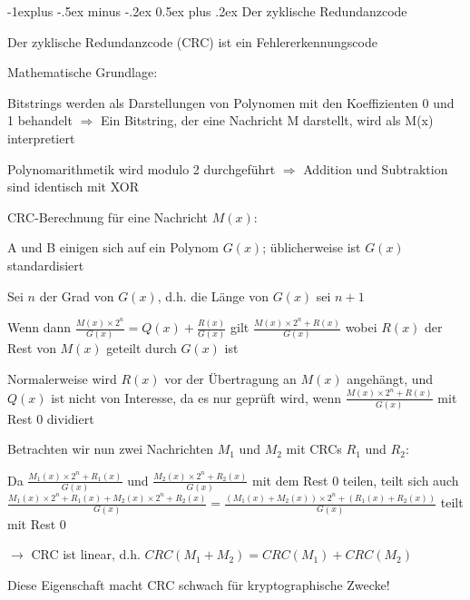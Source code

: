 \documentclass[a4paper]{article}
\makeatletter
\renewcommand{\subsection}{\@startsection{subsection}{2}{0mm}%
 {-1explus -.5ex minus -.2ex}%
 {0.5ex plus .2ex}%
 {\normalfont\normalsize\bfseries}}
\makeatother
\begin{document}
\begin{multicols}{3}
      \subsection{Der zyklische Redundanzcode}
      \begin{itemize*}
            \item Der zyklische Redundanzcode (CRC) ist ein Fehlererkennungscode
            \item Mathematische Grundlage:
            \begin{itemize*}
                  \item Bitstrings werden als Darstellungen von Polynomen mit den Koeffizienten 0 und 1 behandelt $\Rightarrow$ Ein Bitstring, der eine Nachricht M darstellt, wird als M(x) interpretiert
                  \item Polynomarithmetik wird modulo 2 durchgeführt $\Rightarrow$ Addition und Subtraktion sind identisch mit XOR
            \end{itemize*}
            \item CRC-Berechnung für eine Nachricht $M(x)$:
            \begin{itemize*}
                  \item A und B einigen sich auf ein Polynom $G(x)$; üblicherweise ist $G(x)$ standardisiert
                  \item Sei $n$ der Grad von $G(x)$, d.h. die Länge von $G(x)$ sei $n+1$
                  \item Wenn dann $\frac{M(x)\times 2^n}{G(x)}=Q(x)+\frac{R(x)}{G(x)}$ gilt $\frac{M(x)\times 2^n +R(x)}{G(x)}$ wobei $R(x)$ der Rest von $M(x)$ geteilt durch $G(x)$ ist
                  \item Normalerweise wird $R(x)$ vor der Übertragung an $M(x)$ angehängt, und $Q(x)$ ist nicht von Interesse, da es nur geprüft wird, wenn $\frac{M(x)\times 2^n+R(x)}{G(x)}$ mit Rest $0$ dividiert
            \end{itemize*}
            \item Betrachten wir nun zwei Nachrichten $M_1$ und $M_2$ mit CRCs $R_1$ und $R_2$:
            \begin{itemize*}
                  \item Da $\frac{M_1(x)\times 2^n+R_1(x)}{G(x)}$ und $\frac{M_2(x)\times 2^n+R_2(x)}{G(x)}$ mit dem Rest $0$ teilen, teilt sich auch $\frac{M_1(x)\times 2^n +R_1(x)+M_2(x)\times 2^n +R_2(x)}{G(x)} =\frac{(M_1(x)+M_2(x))\times 2^n +(R_1(x)+R_2(x))}{G(x)}$ teilt mit Rest $0$
                  \item[$\rightarrow$] CRC ist linear, d.h. $CRC(M_1 + M_2) = CRC(M_1) + CRC(M_2)$
            \end{itemize*}
            \item Diese Eigenschaft macht CRC schwach für kryptographische Zwecke!
      \end{itemize*}


\end{multicols}
\end{document}
